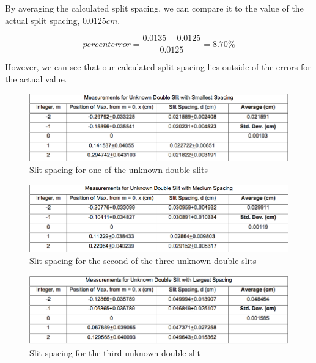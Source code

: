 \documentclass{article}
\begin{document}
By averaging the calculated split spacing, we can compare it to the value of the
actual split spacing, $0.0125 cm$.

\begin{equation}
    \label{percent-error-split-spacing}
    percent error = \frac{0.0135-0.0125}{0.0125} = 8.70\%
\end{equation}

However, we can see that our calculated split spacing lies outside of the errors
for the actual value.

\begin{figure}[H]
    \centering
    \includegraphics[width=\textwidth]{charts/unknown-chart-1}
    \caption{Slit spacing for one of the unknown double slits}
    \label{unknown-chart-1}
\end{figure}

\begin{figure}[H]
    \centering
    \includegraphics[width=\textwidth]{charts/unknown-chart-2}
    \caption{Slit spacing for the second of the three unknown double slits}
    \label{unknown-chart-2}
\end{figure}

\begin{figure}[H]
    \centering
    \includegraphics[width=\textwidth]{charts/unknown-chart-3}
    \caption{Slit spacing for the third unknown double slit}
    \label{unknown-chart-3}
\end{figure}
\end{document}

